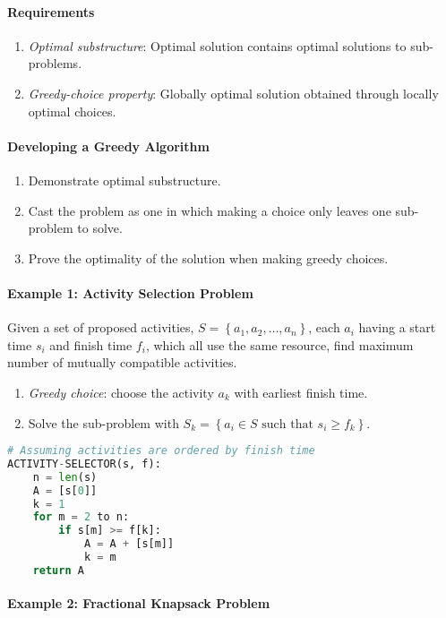 \documentclass[twocolumn,english]{article}
\begin{document}
\paragraph{Requirements}
\begin{enumerate}
\item \emph{Optimal substructure}: Optimal solution contains optimal solutions
to sub-problems.
\item \emph{Greedy-choice property}: Globally optimal solution obtained
through locally optimal choices.
\end{enumerate}

\paragraph{Developing a Greedy Algorithm}
\begin{enumerate}
\item Demonstrate optimal substructure.
\item Cast the problem as one in which making a choice only leaves one sub-problem
to solve.
\item Prove the optimality of the solution when making greedy choices.
\end{enumerate}

\paragraph{Example 1: Activity Selection Problem}

Given a set of proposed activities, $S=\left\{ a_{1},a_{2},\dots,a_{n}\right\} $,
each $a_{i}$ having a start time $s_{i}$ and finish time $f_{i}$,
which all use the same resource, find maximum number of mutually compatible
activities.
\begin{enumerate}
\item \emph{Greedy choice}: choose the activity $a_{k}$ with earliest finish
time.
\item Solve the sub-problem with $S_{k}=\left\{ a_{i}\in S\text{ such that }s_{i}\geq f_{k}\right\} $.
\end{enumerate}
\begin{lstlisting}[language=Python,basicstyle={\footnotesize\ttfamily},tabsize=4,frame=single]
# Assuming activities are ordered by finish time
ACTIVITY-SELECTOR(s, f):
	n = len(s)
	A = [s[0]]
	k = 1
	for m = 2 to n:
		if s[m] >= f[k]:
			A = A + [s[m]]
			k = m
	return A
\end{lstlisting}

\paragraph{Example 2: Fractional Knapsack Problem}
\end{document}
